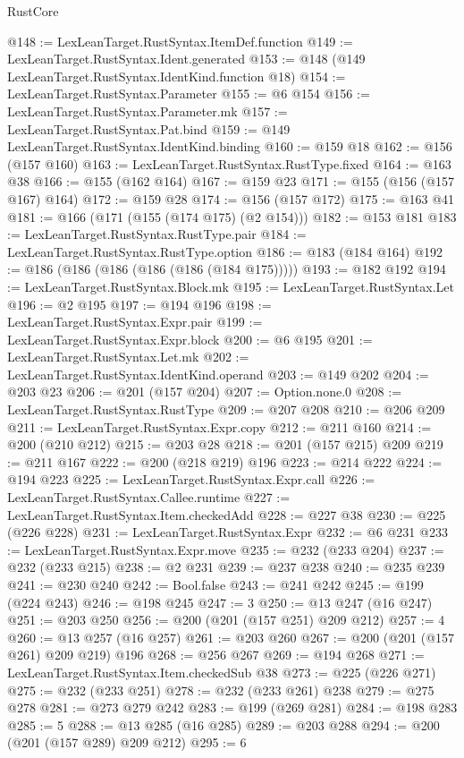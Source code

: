\begin{lexlean}{RustCore}
\begin{coremodule}
@148 := LexLeanTarget.RustSyntax.ItemDef.function
@149 := LexLeanTarget.RustSyntax.Ident.generated
@153 := @148 (@149 LexLeanTarget.RustSyntax.IdentKind.function @18)
@154 := LexLeanTarget.RustSyntax.Parameter
@155 := @6 @154
@156 := LexLeanTarget.RustSyntax.Parameter.mk
@157 := LexLeanTarget.RustSyntax.Pat.bind
@159 := @149 LexLeanTarget.RustSyntax.IdentKind.binding
@160 := @159 @18
@162 := @156 (@157 @160)
@163 := LexLeanTarget.RustSyntax.RustType.fixed
@164 := @163 @38
@166 := @155 (@162 @164)
@167 := @159 @23
@171 := @155 (@156 (@157 @167) @164)
@172 := @159 @28
@174 := @156 (@157 @172)
@175 := @163 @41
@181 := @166 (@171 (@155 (@174 @175) (@2 @154)))
@182 := @153 @181
@183 := LexLeanTarget.RustSyntax.RustType.pair
@184 := LexLeanTarget.RustSyntax.RustType.option
@186 := @183 (@184 @164)
@192 := @186 (@186 (@186 (@186 (@186 (@184 @175)))))
@193 := @182 @192
@194 := LexLeanTarget.RustSyntax.Block.mk
@195 := LexLeanTarget.RustSyntax.Let
@196 := @2 @195
@197 := @194 @196
@198 := LexLeanTarget.RustSyntax.Expr.pair
@199 := LexLeanTarget.RustSyntax.Expr.block
@200 := @6 @195
@201 := LexLeanTarget.RustSyntax.Let.mk
@202 := LexLeanTarget.RustSyntax.IdentKind.operand
@203 := @149 @202
@204 := @203 @23
@206 := @201 (@157 @204)
@207 := Option.none.{0}
@208 := LexLeanTarget.RustSyntax.RustType
@209 := @207 @208
@210 := @206 @209
@211 := LexLeanTarget.RustSyntax.Expr.copy
@212 := @211 @160
@214 := @200 (@210 @212)
@215 := @203 @28
@218 := @201 (@157 @215) @209
@219 := @211 @167
@222 := @200 (@218 @219) @196
@223 := @214 @222
@224 := @194 @223
@225 := LexLeanTarget.RustSyntax.Expr.call
@226 := LexLeanTarget.RustSyntax.Callee.runtime
@227 := LexLeanTarget.RustSyntax.Item.checkedAdd
@228 := @227 @38
@230 := @225 (@226 @228)
@231 := LexLeanTarget.RustSyntax.Expr
@232 := @6 @231
@233 := LexLeanTarget.RustSyntax.Expr.move
@235 := @232 (@233 @204)
@237 := @232 (@233 @215)
@238 := @2 @231
@239 := @237 @238
@240 := @235 @239
@241 := @230 @240
@242 := Bool.false
@243 := @241 @242
@245 := @199 (@224 @243)
@246 := @198 @245
@247 := 3
@250 := @13 @247 (@16 @247)
@251 := @203 @250
@256 := @200 (@201 (@157 @251) @209 @212)
@257 := 4
@260 := @13 @257 (@16 @257)
@261 := @203 @260
@267 := @200 (@201 (@157 @261) @209 @219) @196
@268 := @256 @267
@269 := @194 @268
@271 := LexLeanTarget.RustSyntax.Item.checkedSub @38
@273 := @225 (@226 @271)
@275 := @232 (@233 @251)
@278 := @232 (@233 @261) @238
@279 := @275 @278
@281 := @273 @279 @242
@283 := @199 (@269 @281)
@284 := @198 @283
@285 := 5
@288 := @13 @285 (@16 @285)
@289 := @203 @288
@294 := @200 (@201 (@157 @289) @209 @212)
@295 := 6

\end{coremodule}
\end{lexlean}
